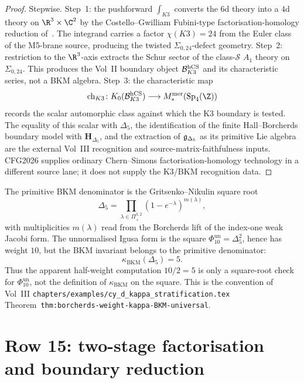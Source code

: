 \begin{proof}
Stepwise. Step~1: the pushforward $\int_{K3}$ converts the
6d theory into a $4$d theory on $\R^3\times\C^2$ by the
Costello--Gwilliam Fubini-type factorisation-homology reduction
of~\cite[Ch.~3, \S3.6]{CG17}. The integrand carries a factor
$\chi(K3) = 24$ from the Euler class of the M5-brane source,
producing the twisted $\Sigma_{0,24}$-defect geometry. Step~2:
restriction to the $\R^3$-axis extracts the Schur sector of the
class-$\mathcal S$ $A_1$ theory on $\Sigma_{0,24}$. This produces the
Vol~II boundary object $\mathcal{B}^{\mathrm{hCS}}_{K3}$ and its characteristic series,
not a BKM algebra. Step~3: the characteristic map
\[
 \mathrm{ch}_{K3}\colon
 K_0(\cB^{\hCS}_{K3}) \longrightarrow
 M^{\mathrm{mer}}_{\ast}(\mathrm{Sp}_4(\Z))
\]
records the scalar automorphic class against which the K3 boundary is
tested. The equality of this scalar with $\Delta_5$, the identification
of the finite Hall--Borcherds boundary model with
$\mathbf H_{\Delta_5}$, and the extraction of
$\mathfrak{g}_{\Delta_5}$ as its primitive Lie algebra are the external Vol~III
recognition and source-matrix-faithfulness inputs. CFG2026 supplies ordinary Chern--Simons
factorisation-homology technology in a different source lane; it does
not supply the K3/BKM recognition data.
\end{proof}

\begin{remark}
\label{rem:cfg-row-14-denominator}
The primitive BKM denominator is the Gritsenko--Nikulin square root
\[
  \Delta_5
  =
  \prod_{\lambda\in\Pi^{3,2}_+}(1-e^{-\lambda})^{m(\lambda)} ,
\]
with multiplicities \(m(\lambda)\) read from the Borcherds lift of the
index-one weak Jacobi form. The unnormalised Igusa form is the square
\(\Phi_{10}^{\mathrm{un}}=\Delta_5^2\), hence has weight \(10\), but
the BKM invariant belongs to the primitive denominator:
\[
  \kappa_{\mathrm{BKM}}(\Delta_5)=5 .
\]
Thus the apparent half-weight computation \(10/2=5\) is only a square-root
check for \(\Phi_{10}^{\mathrm{un}}\), not the definition of
\(\kappa_{\mathrm{BKM}}\) on the square. This is the convention of
Vol~III
\texttt{chapters/examples/cy\_d\_kappa\_stratification.tex}
Theorem~\texttt{thm:borcherds-weight-kappa-BKM-universal}.
\end{remark}

\section{Row 15: two-stage factorisation and boundary reduction}
\label{sec:cfg-row-15-two-stage}

